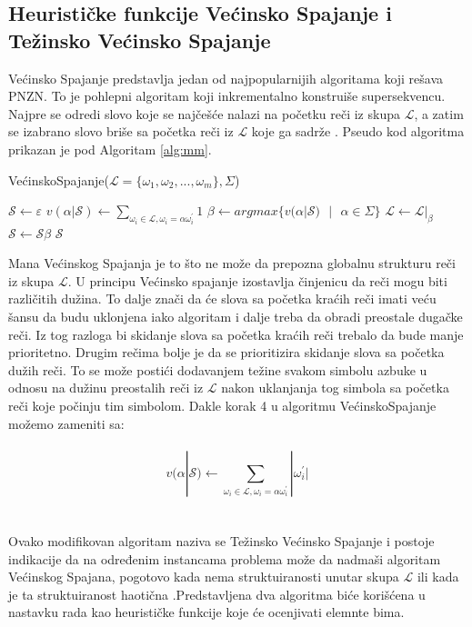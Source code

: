 \documentclass[12pt,oneside]{memoir}
\begin{document}
\subsection{Heurističke funkcije Većinsko Spajanje i Težinsko Većinsko Spajanje}
\label{sec:mmiwmm}
Većinsko Spajanje predstavlja jedan od najpopularnijih algoritama koji rešava PNZN. To je pohlepni algoritam
koji inkrementalno konstruiše supersekvencu. Najpre se odredi slovo koje se najčešće nalazi na početku reči
iz skupa $\mathcal{L}$, a zatim se izabrano slovo briše sa početka reči iz $\mathcal{L}$ koje ga sadrže \cite{ProbabilisticBS}.
Pseudo kod algoritma prikazan je pod Algoritam \ref{alg:mm}.

\begin{algorithm}
  \caption{VećinskoSpajanje($\mathcal{L}=\{\omega_{1}, \omega_{2},..., \omega_{m}\}, \Sigma$)}
  \label{alg:mm}
  \begin{algorithmic}[1]
  \State $\mathcal{S} \gets \varepsilon$ 
  \For{$\alpha \in \Sigma$}
        \State $v(\alpha|\mathcal{S}) \gets \sum_{\omega_{i}\in\mathcal{L},\omega_{i}=\alpha\omega^{'}_{i}}1$
  \EndFor
  \State $\beta \gets argmax \{v(\alpha|\mathcal{S})\textrm{ }|\textrm{ }\alpha \in \Sigma \}$
  \State $\mathcal{L} \gets \mathcal{L}|_{\beta}$
  \State $\mathcal{S} \gets \mathcal{S}\beta$
  \EndWhile
  \State \Return $\mathcal{S}$
  \end{algorithmic}
  \end{algorithm}

Mana Većinskog Spajanja je to što ne može da prepozna globalnu strukturu reči iz skupa $\mathcal{L}$.
U principu Većinsko spajanje izostavlja činjenicu da reči mogu biti različitih dužina. To dalje 
znači da će slova sa početka kraćih reči imati veću šansu da budu uklonjena iako algoritam i dalje treba
da obradi preostale dugačke reči. Iz tog razloga bi skidanje slova sa početka kraćih reči trebalo da bude
manje prioritetno. Drugim rečima bolje je da se prioritizira skidanje slova sa početka dužih reči.
To se može postići dodavanjem težine svakom simbolu azbuke u odnosu na dužinu preostalih reči iz $\mathcal{L}$ 
nakon uklanjanja tog simbola sa početka reči koje počinju tim simbolom. Dakle korak 4 u algoritmu VećinskoSpajanje
možemo zameniti sa:
\\
\\
\begin{equation}
  \label{eqn:wmm}
  v(\alpha|\mathcal{S}) \gets \sum_{\omega_{i}\in\mathcal{L},\omega_{i}=\alpha\omega^{'}_{i}}|\omega^{'}_{i}| 
\end{equation}
\\
\\
Ovako modifikovan algoritam naziva se Težinsko Većinsko Spajanje i postoje indikacije da na određenim instancama
problema može da nadmaši algoritam Većinskog Spajana, pogotovo kada nema struktuiranosti unutar skupa $\mathcal{L}$
ili kada je ta struktuiranost haotična \cite{ProbabilisticBS}.Predstavljena dva algoritma biće korišćena u nastavku
rada kao heurističke funkcije koje će ocenjivati elemnte bima.
\end{document}
